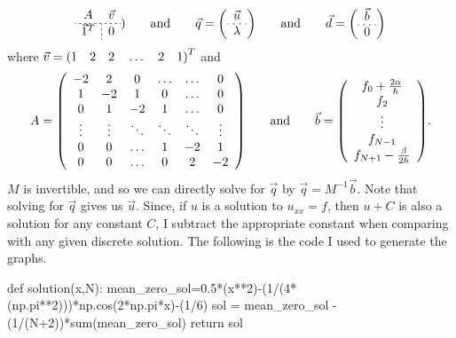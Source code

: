 \documentclass{article} %
\theoremstyle{plain}
\numberwithin{equation}{section} %
\numberwithin{figure}{section} %
\numberwithin{table}{section} %
\begin{document}
\begin{enumerate}[\ \ (a)]
\begin{align}
\begin{array}{c;{2pt/2pt}c}
                A & \vec{v} \\ \hdashline[2pt/2pt] \vec{1}^T & 0
            \end{array}) \qquad \text{and} \qquad \vec{q} = \qty(\begin{array}{c}
                \vec{u} \\ \hdashline[2pt/2pt] \lambda
            \end{array}) \qquad \text{and} \qquad \vec{d} = \qty(\begin{array}{c} \vec{b} \\ \hdashline[2pt/2pt] 0\end{array})
        \end{align}
        where $\vec{v} = \qty(1\ \ \ 2\ \ \ 2\ \ \ \dots\ \ \ 2\ \ \ 1)^T$ and
        \begin{align}
            A = \qty(\begin{array}{cccccc}
                -2 & 2 & 0 & \dots & \dots & 0 \\
                1 & -2 & 1 & 0 & \dots & 0 \\
                0 & 1 & -2 & 1 & \dots & 0 \\
                \vdots & \vdots & \ddots & \ddots & \ddots & \vdots \\
                0 & 0 & \dots & 1 & -2 & 1 \\
                0 & 0 & \dots & 0 & 2 & -2
            \end{array}) \qquad \text{and} \qquad \vec{b} = \qty(\begin{array}{c}
                f_0 + \frac{2\alpha}{h} \\ f_2 \\ \vdots \\ f_{N-1} \\ f_{N+1} - \frac{\beta}{2h}
            \end{array}).
        \end{align}
        $M$ is invertible, and so we can directly solve for $\vec{q}$ by $\vec{q} = M^{-1}\vec{b}$.  Note that solving for $\vec{q}$ gives us $\vec{u}$.  Since, if $u$ is a solution to $u_{xx} = f$, then $u+C$ is also a solution for any constant $C$, I subtract the appropriate constant when comparing with any given discrete solution.  The following is the code I used to generate the graphs.
        \begin{code}
def solution(x,N):
    mean_zero_sol=0.5*(x**2)-(1/(4*(np.pi**2)))*np.cos(2*np.pi*x)-(1/6)
    sol = mean_zero_sol - (1/(N+2))*sum(mean_zero_sol)
    return sol


\end{code}
\end{enumerate}
\end{document}
